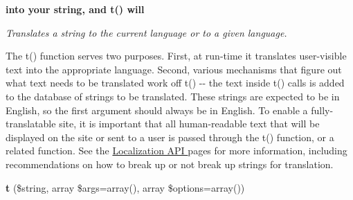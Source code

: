 \begin{Indent}{\bf into your string, and t() will}\par
{\em \label{_amgrpc24520cd0c9d113d5113bfec581ba6b9}
 Translates a string to the current language or to a given language.

The t() function serves two purposes. First, at run-\/time it translates user-\/visible text into the appropriate language. Second, various mechanisms that figure out what text needs to be translated work off t() -\/-\/ the text inside t() calls is added to the database of strings to be translated. These strings are expected to be in English, so the first argument should always be in English. To enable a fully-\/translatable site, it is important that all human-\/readable text that will be displayed on the site or sent to a user is passed through the t() function, or a related function. See the \hyperlink{}{Localization API } pages for more information, including recommendations on how to break up or not break up strings for translation.}\begin{DoxyCompactItemize}
\item 
\hypertarget{bootstrap_8inc_a1be9937b04ff350b23d01fddef1e031a}{
{\bfseries t} (\$string, array \$args=array(), array \$options=array())}
\label{bootstrap_8inc_a1be9937b04ff350b23d01fddef1e031a}


\end{DoxyCompactItemize}
\end{Indent}
